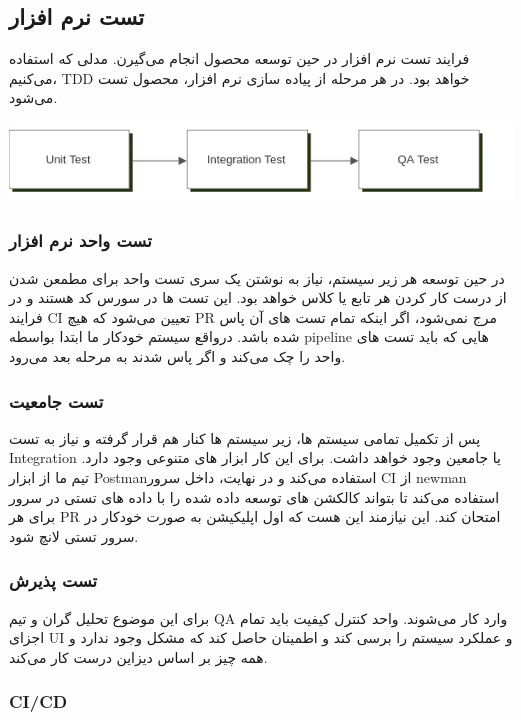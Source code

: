 \subsection{تست نرم افزار}

فرایند تست نرم افزار در حین توسعه محصول انجام می‌گیرن. مدلی که استفاده می‌کنیم، TDD خواهد بود. در هر مرحله از پیاده سازی نرم افزار، محصول تست می‌شود.

\includegraphics[scale=1]{assets/testing_DFD.png}

\subsubsection{تست واحد نرم افزار}

در حین توسعه هر زیر سیستم، نیاز به نوشتن یک سری تست واحد برای مطمعن شدن از درست کار کردن هر تابع یا کلاس خواهد بود. این تست ها در سورس کد هستند 
و در فرایند CI تعیین می‌شود که هیچ PR مرج نمی‌شود، اگر اینکه تمام تست های آن پاس شده باشد.
درواقع سیستم خودکار ما ابتدا بواسطه pipeline هایی که باید تست های واحد را چک می‌کند و اگر پاس شدند به مرحله بعد می‌رود.

\subsubsection{تست جامعیت}

پس از تکمیل تمامی سیستم ها، زیر سیستم ها کنار هم قرار گرفته و نیاز به تست Integration یا جامعین وجود خواهد داشت.
برای این کار ابزار های متنوعی وجود دارد. تیم ما از ابزار Postmanاستفاده می‌کند و در نهایت، داخل سرور CI
از newman استفاده می‌کند تا بتواند کالکشن های توسعه داده شده را با داده های تستی در سرور برای هر PR امتحان کند. این نیازمند این هست که اول اپلیکیشن به صورت خودکار در سرور تستی لانچ شود.

\subsubsection{تست پذیرش}

برای این موضوع تحلیل گران و تیم QA وارد کار می‌شوند. واحد کنترل کیفیت باید تمام اجزای UI و عملکرد سیستم را برسی کند و اطمینان حاصل کند که مشکل وجود ندارد و همه چیز بر اساس دیزاین درست کار می‌کند.


\subsubsection{CI/CD}

